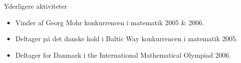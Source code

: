 \documentclass[11pt,oneside]{article}
\newenvironment{ressection}[1]{
	\vspace{4pt}
	{\fontfamily{phv}\selectfont\Large#1}
	\begin{itemize}
	\vspace{3pt}
}{
	\end{itemize}
}
\newcommand{\resitem}[1]{
	\vspace{-4pt}
	\item \begin{flushleft} #1 \end{flushleft}
}
\begin{document}

\begin{ressection}{Yderligere aktiviteter}

	\resitem{Vinder af Georg Mohr konkurrencen i matematik 2005 \& 2006.}
	
	\resitem{Deltager på det danske hold i Baltic Way konkurrencen i matematik 2005.}
	
	\resitem{Deltager for Danmark i the International Mathematical Olympiad 2006.}

\end{ressection}
\end{document}
